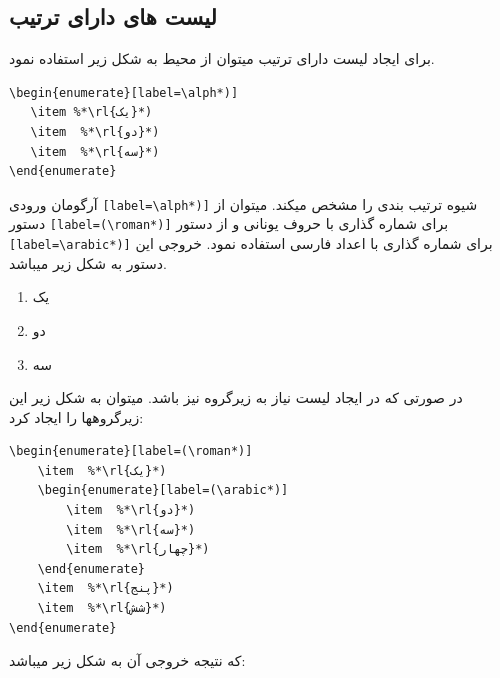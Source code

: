 \subsection{لیست های دارای ترتیب }
برای ایجاد لیست دارای ترتیب میتوان از محیط 
به شکل زیر استفاده نمود.
\begin{latin}
 \begin{lstlisting}[style=Tex]
\begin{enumerate}[label=\alph*)]
   \item %*\rl{یک}*)
   \item  %*\rl{دو}*)
   \item  %*\rl{سه}*)
\end{enumerate}
\end{lstlisting}
\end{latin}
 
آرگومان ورودی 
\verb![label=\alph*)]!
شیوه ترتیب بندی را مشخص میکند. میتوان از دستور 
\verb![label=(\roman*)]!
برای شماره گذاری با حروف یونانی و از دستور 
\verb![label=\arabic*)]!
برای شماره گذاری با اعداد فارسی استفاده نمود.
خروجی این دستور به شکل زیر میباشد.

\begin{enumerate}[label=\alph*)]
	\item یک
	\item دو
	\item سه
\end{enumerate}



در صورتی که در ایجاد لیست نیاز به زیرگروه نیز باشد. میتوان به شکل زیر این زیرگروهها را ایجاد کرد:


\begin{latin}
\begin{lstlisting}[style=Tex]
\begin{enumerate}[label=(\roman*)]
    \item  %*\rl{یک}*)
    \begin{enumerate}[label=(\arabic*)]
        \item  %*\rl{دو}*)
        \item  %*\rl{سه}*)
        \item  %*\rl{چهار}*)
    \end{enumerate}
    \item  %*\rl{پنج}*)
    \item  %*\rl{شش}*)
\end{enumerate}
\end{lstlisting}
\end{latin}
 که نتیجه خروجی آن به شکل زیر میباشد:

